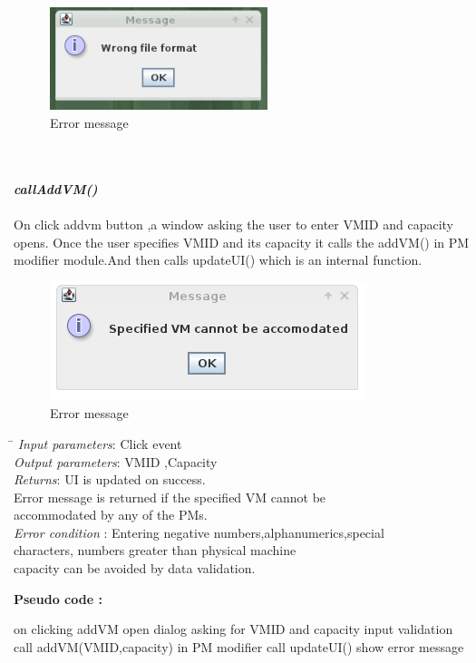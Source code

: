 \documentclass{article}
\begin{document}
\begin{figure}[h]
 \centering
 \includegraphics[height=3cm]{7.png}
 \caption{Error message}
\end{figure}
\pagebreak
\mbox{}\\\\
\emph{\bf callAddVM()}\\\\
 On click addvm button ,a window asking the user to enter VM\textunderscore ID and  capacity opens.
  Once the user specifies VM\textunderscore ID and its capacity it calls the addVM() in PM modifier module.And then calls updateUI() which is an internal function.
  \\
  \begin{figure}[ht!]
 \centering
 \includegraphics[scale=0.5, angle=0]{8.png}
 \caption{Error message}
\end{figure}
  \begin{tabbing}
  \hspace*{4cm}\= \kill
  \emph{Input parameters}\>: Click event\\
\emph{Output parameters}\>: VM\textunderscore ID ,Capacity\\
\emph{Returns}\>: UI is updated on success. \\ \> Error message is returned if the specified VM cannot be \\ \> accommodated by any of the PMs.\\
\emph{Error condition} \>: Entering negative numbers,alphanumerics,special \\ \> characters, numbers greater than  physical machine \\ \>capacity can be avoided by data validation.
 \\
 \end{tabbing}
  \textbf{Pseudo code :}
 \begin{algorithmic}[1]
\STATE on clicking addVM
\STATE open dialog asking for VM\textunderscore ID and capacity
\STATE input validation
\STATE call addVM(VM\textunderscore ID,capacity) in PM modifier
\STATE call updateUI()
\ELSE 
\STATE show error message
\ENDIF
 \end{algorithmic}
\end{document}
